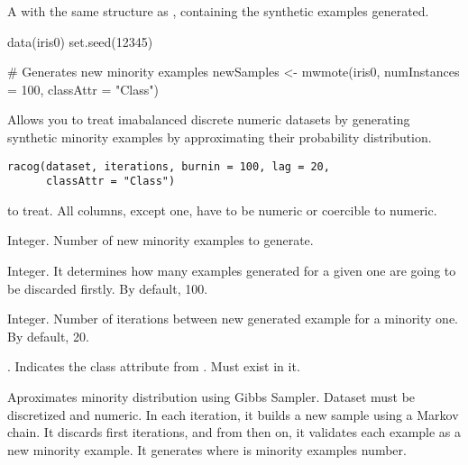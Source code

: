 %
\begin{Value}
A  with the same structure as ,
containing the synthetic examples generated.
\end{Value}
%
\begin{Examples}
\begin{ExampleCode}
data(iris0)
set.seed(12345)

# Generates new minority examples
newSamples <- mwmote(iris0, numInstances = 100, classAttr = "Class")

\end{ExampleCode}
\end{Examples}
%
\begin{Description}\relax
Allows you to treat imabalanced discrete numeric datasets by generating
synthetic minority examples by approximating their probability distribution.
\end{Description}
%
\begin{Usage}
\begin{verbatim}
racog(dataset, iterations, burnin = 100, lag = 20, 
      classAttr = "Class")
\end{verbatim}
\end{Usage}
%
\begin{Arguments}
\begin{ldescription}
\item[\code{dataset}]  to treat. All columns, except
 one, have to be numeric or coercible to numeric.

\item[\code{numInstances}] Integer. Number of new minority examples to generate.

\item[\code{burnin}] Integer. It determines how many examples generated for a given
one are going to be discarded firstly. By default, 100.

\item[\code{lag}] Integer. Number of iterations between new generated example for a
minority one. By default, 20.

\item[\code{classAttr}] . Indicates the class attribute from
. Must exist in it.
\end{ldescription}
\end{Arguments}
%
\begin{Details}\relax
Aproximates minority distribution using Gibbs Sampler. Dataset must be
discretized and numeric. In each iteration, it builds a new sample using a
Markov chain. It discards first  iterations, and from then on,
it validates each  example as a new minority example. It generates
 where  is minority examples number.
\end{Details}
